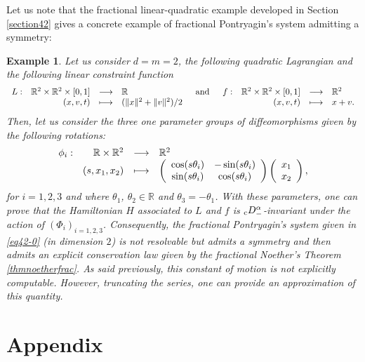 \documentclass[english,11pt,reqno]{smfart}
\newtheorem{example}[theorem]{Example}
\newcommand{\R}{\mathbb{R}}
\newcommand{\cDM}{{}_{{\rm c}} D^\alpha_-}
\newcommand{\fonction}[5]{\begin{array}[t]{lrcl}#1 :&#2 &\longrightarrow &#3\\&#4& \longmapsto &#5 \end{array}}
\begin{document}
Let us note that the fractional linear-quadratic example developed in Section \ref{section42} gives a concrete example of fractional Pontryagin's system admitting a symmetry:
\begin{example}\label{ex4}
Let us consider $d = m = 2$, the following quadratic Lagrangian and the following linear constraint function
\begin{equation}
\fonction{L}{\R^2 \times \R^2 \times [0,1]}{\R}{(x,v,t)}{(\Vert x \Vert^2 + \Vert v \Vert^2 )/2} \quad \text{and} \quad \fonction{f}{\R^2 \times \R^2 \times [0,1]}{\R^2}{(x,v,t)}{x+v.}
\end{equation}
Then, let us consider the three one parameter groups of diffeomorphisms given by the following rotations:
\begin{equation}\label{rotation}
\fonction{\phi_i}{\R \times \R^2}{\R^2}{(s,x_1,x_2)}{\left( \begin{array}{cc} \cos (s \theta_i) & - \sin (s \theta_i) \\ \sin (s \theta_i) & \cos (s \theta_i)  \end{array} \right) \left( \begin{array}{c} x_1 \\ x_2 \end{array} \right),}
\end{equation}
for $i=1,2,3$ and where $\theta_1$, $\theta_2 \in \R$ and $\theta_3 = - \theta_1$. With these parameters, one can prove that the Hamiltonian $H$ associated to $L$ and $f$ is $\cDM$-invariant under the action of $(\Phi_i)_{i=1,2,3}$. Consequently, the fractional Pontryagin's system given in \eqref{eq42-0} (in dimension $2$) is not resolvable but admits a symmetry and then admits an explicit conservation law given by the fractional Noether's Theorem \ref{thmnoetherfrac}. As said previously, this constant of motion is not explicitly computable. However, truncating the series, one can provide an approximation of this quantity.
\end{example}


\appendix

\section{Appendix}\label{appA}
\end{document}
